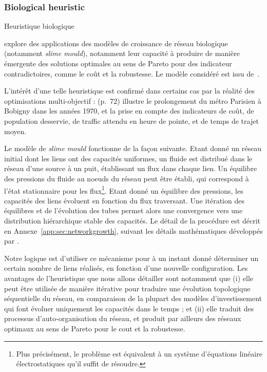 \subsubsection{Biological heuristic}{Heuristique biologique}

\cite{raimbault2015labex} explore des applications des modèles de croissance de réseau biologique (notamment \emph{slime mould}), notamment leur capacité à produire de manière émergente des solutions optimales au sens de Pareto pour des indicateur contradictoires, comme le coût et la robustesse. Le modèle considéré est issu de~\cite{tero2010rules}.

L'intérêt d'une telle heuristique est confirmé dans certains cas par la réalité des optimisations multi-objectif : \cite{padeiro:tel-00438092} (p.~72) illustre le prolongement du métro Parisien à Bobigny dans les années 1970, et la prise en compte des indicateurs de coût, de population desservie, de traffic attendu en heure de pointe, et de temps de trajet moyen.

Le modèle de \emph{slime mould} fonctionne de la façon suivante. Etant donné un réseau initial dont les liens ont des capacités uniformes, un fluide est distribué dans le réseau d'une source à un puit, établissant un flux dans chaque lien. Un équilibre des pressions du fluide au noeuds du réseau peut être établi, qui correspond à l'état stationnaire pour les flux\footnote{Plus précisément, le problème est équivalent à un système d'équations linéaire électrostatiques qu'il suffit de résoudre.}. Etant donné un équilibre des pressions, les capacités des liens évoluent en fonction du flux traversant. Une itération des équilibres et de l'évolution des tubes permet alors une convergence vers une distribution hiérarchique stable des capacités. Le détail de la procédure est décrit en Annexe~\ref{app:sec:networkgrowth}, suivant les détails mathématiques développés par \cite{tero2007mathematical}.


Notre logique est d'utiliser ce mécanisme pour à un instant donné déterminer un certain nombre de liens réalisés, en fonction d'une nouvelle configuration. Les avantages de l'heuristique que nous allons détailler sont notamment que (i) elle peut être utilisée de manière itérative pour traduire une évolution topologique séquentielle du réseau, en comparaison de la plupart des modèles d'investissement qui font évoluer uniquement les capacités dans le temps ; et (ii) elle traduit des processus d'auto-organisation du réseau, et produit par ailleurs des réseaux optimaux au sens de Pareto pour le cout et la robustesse.


